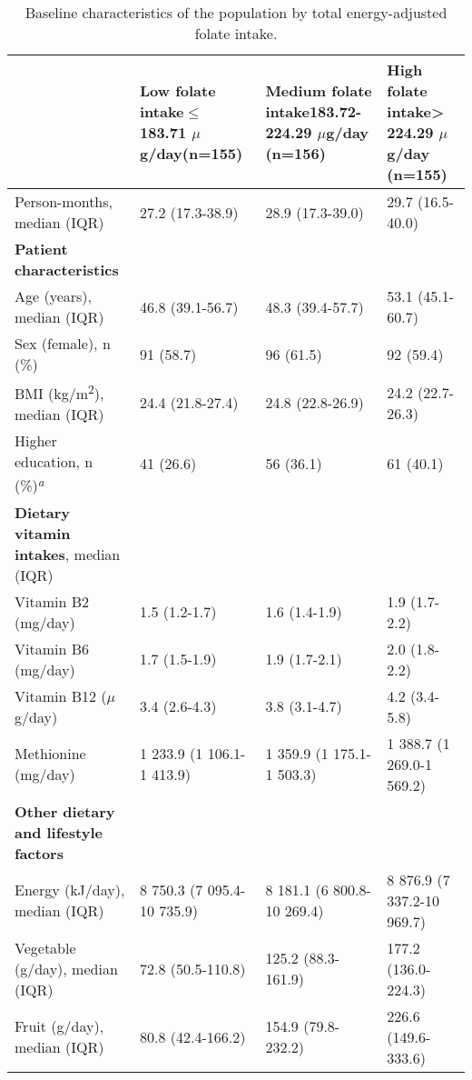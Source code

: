 \begin{table}
\small
\caption{Baseline characteristics of the population by total energy-adjusted folate intake.}
\label{table6_1}
\begin{adjustbox}{width=\textwidth}
\begin{tabular}{C{4.795cm}C{3.5cm}C{3.5cm}C{3.3cm}}

\hline 
~ & {\bfseries Low folate intake}{\bfseries ${\leq}$ 183.71 $\mu$g/day}\bfseries (n=155) & {\bfseries Medium folate intake}\bfseries 183.72-224.29 $\mu$g/day (n=156) & {\bfseries High folate intake}{\bfseries {\textgreater} 224.29 $\mu$g/day} \bfseries (n=155)\\
\hline
 Person-months, median (IQR) & 27.2 (17.3-38.9) & 28.9 (17.3-39.0) & 29.7 (16.5-40.0)\\
\hline
\bfseries Patient characteristics & ~ & ~ & ~ \\
\hline
{Age (years), median (IQR)} & 46.8 (39.1-56.7) & 48.3 (39.4-57.7) & 53.1 (45.1-60.7)\\
 Sex (female), n (\%) & 91 (58.7) & 96 (61.5) & 92 (59.4)\\
 {BMI (kg/m}{\textsuperscript{2}}{), median (IQR)} & 24.4 (21.8-27.4) & 24.8 (22.8-26.9) & 24.2 (22.7-26.3)\\
{Higher education, n (\%)}{\textit{\textsuperscript{a}}} & 41 (26.6) & 56 (36.1) & 61 (40.1)\\
\hline
{\textbf{Dietary vitamin intakes}}{, median (IQR)} & ~ & ~ & ~ \\
\hline
 Vitamin B2 (mg/day) & 1.5 (1.2-1.7) & 1.6 (1.4-1.9) & 1.9 (1.7-2.2)\\
 Vitamin B6 (mg/day) & 1.7 (1.5-1.9) & 1.9 (1.7-2.1) & 2.0 (1.8-2.2)\\
 Vitamin B12 ($\mu$g/day) & 3.4 (2.6-4.3) & 3.8 (3.1-4.7) & 4.2 (3.4-5.8)\\
 Methionine (mg/day) & 1 233.9 (1 106.1-1 413.9) & 1 359.9 (1 175.1-1 503.3) & 1 388.7 (1 269.0-1 569.2)\\
\hline
\bfseries Other dietary and lifestyle factors & ~ & ~ & ~ \\
\hline
 Energy (kJ/day), median (IQR) & 8 750.3 (7 095.4-10 735.9) & 8 181.1 (6 800.8-10 269.4) & 8 876.9 (7 337.2-10 969.7)\\
 Vegetable (g/day), median (IQR) & 72.8 (50.5-110.8) & 125.2 (88.3-161.9) & 177.2 (136.0-224.3)\\
 Fruit (g/day), median (IQR) & 80.8 (42.4-166.2) & 154.9 (79.8-232.2) & 226.6 (149.6-333.6)\\

\end{tabular}
\end{adjustbox}
\end{table}

